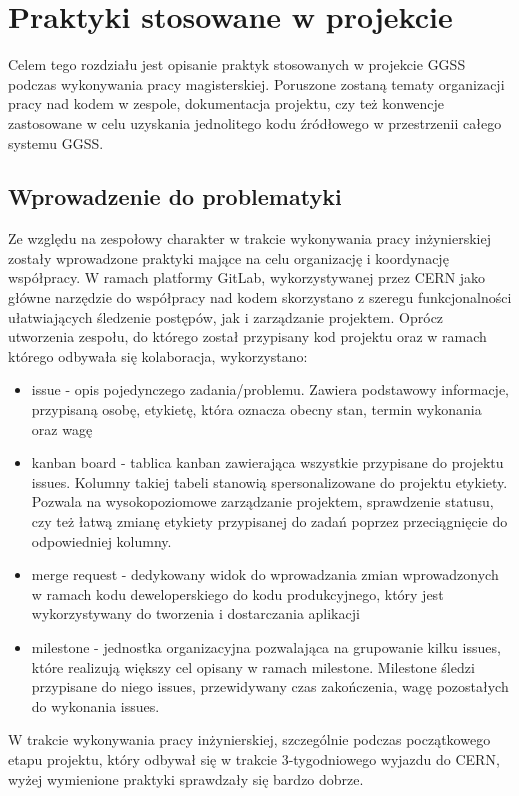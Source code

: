 \chapter{Praktyki stosowane w projekcie} %
\label{cha:practices}

Celem tego rozdziału jest opisanie praktyk stosowanych w projekcie GGSS podczas wykonywania pracy magisterskiej. Poruszone zostaną tematy organizacji pracy nad kodem w zespole, dokumentacja projektu, czy też konwencje zastosowane w celu uzyskania jednolitego kodu źródłowego w przestrzenii całego systemu GGSS.

\section{Wprowadzenie do problematyki}
Ze względu na zespołowy charakter w trakcie wykonywania pracy inżynierskiej zostały wprowadzone praktyki mające na celu organizację i koordynację współpracy. W ramach platformy GitLab, wykorzystywanej przez CERN jako główne narzędzie do współpracy nad kodem skorzystano z szeregu funkcjonalności ułatwiających śledzenie postępów, jak i zarządzanie projektem. Oprócz utworzenia zespołu, do którego został przypisany kod projektu oraz w ramach którego odbywała się kolaboracja, wykorzystano:
\begin{itemize}
\item issue - opis pojedynczego zadania/problemu. Zawiera podstawowy informacje, przypisaną osobę, etykietę, która oznacza obecny stan, termin wykonania oraz wagę
\item kanban board - tablica kanban zawierająca wszystkie przypisane do projektu issues. Kolumny takiej tabeli stanowią spersonalizowane do projektu etykiety. Pozwala na wysokopoziomowe zarządzanie projektem, sprawdzenie statusu, czy też łatwą zmianę etykiety przypisanej do zadań poprzez przeciągnięcie do odpowiedniej kolumny.
\item merge request -  dedykowany widok do wprowadzania zmian wprowadzonych w ramach kodu deweloperskiego do kodu produkcyjnego, który jest wykorzystywany do tworzenia i dostarczania aplikacji
\item milestone - jednostka organizacyjna pozwalająca na grupowanie kilku issues, które realizują większy cel opisany w ramach milestone. Milestone śledzi przypisane do niego issues, przewidywany czas zakończenia, wagę pozostałych do wykonania issues.
\end{itemize}
W trakcie wykonywania pracy inżynierskiej, szczególnie podczas początkowego etapu projektu, który odbywał się w trakcie 3-tygodniowego wyjazdu do CERN, wyżej wymienione praktyki sprawdzały się bardzo dobrze.

